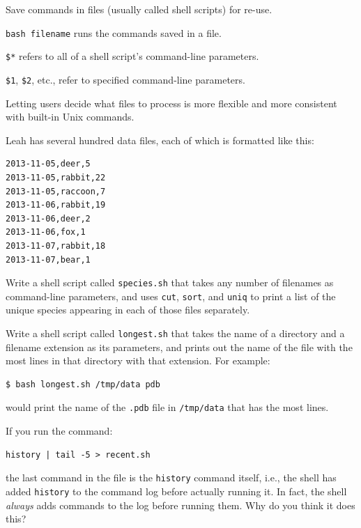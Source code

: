 \documentclass{book}
\begin{document}
\begin{keypoints}
\begin{swcitemize}
\item
  Save commands in files (usually called shell scripts) for re-use.
\item
  \texttt{bash filename} runs the commands saved in a file.
\item
  \texttt{\$*} refers to all of a shell script's command-line
  parameters.
\item
  \texttt{\$1}, \texttt{\$2}, etc., refer to specified command-line
  parameters.
\item
  Letting users decide what files to process is more flexible and more
  consistent with built-in Unix commands.
\end{swcitemize}
\end{keypoints}

\begin{challenge}
  Leah has several hundred data files, each of which is formatted like
  this:

\begin{verbatim}
2013-11-05,deer,5
2013-11-05,rabbit,22
2013-11-05,raccoon,7
2013-11-06,rabbit,19
2013-11-06,deer,2
2013-11-06,fox,1
2013-11-07,rabbit,18
2013-11-07,bear,1
\end{verbatim}

  Write a shell script called \texttt{species.sh} that takes any number
  of filenames as command-line parameters, and uses \texttt{cut},
  \texttt{sort}, and \texttt{uniq} to print a list of the unique species
  appearing in each of those files separately.
\end{challenge}

\begin{challenge}
  Write a shell script called \texttt{longest.sh} that takes the name of
  a directory and a filename extension as its parameters, and prints out
  the name of the file with the most lines in that directory with that
  extension. For example:

\begin{verbatim}
$ bash longest.sh /tmp/data pdb
\end{verbatim}

  would print the name of the \texttt{.pdb} file in \texttt{/tmp/data}
  that has the most lines.
\end{challenge}

\begin{challenge}
  If you run the command:

\begin{verbatim}
history | tail -5 > recent.sh
\end{verbatim}

  the last command in the file is the \texttt{history} command itself,
  i.e., the shell has added \texttt{history} to the command log before
  actually running it. In fact, the shell \emph{always} adds commands to
  the log before running them. Why do you think it does this?
\end{challenge}
\end{document}
